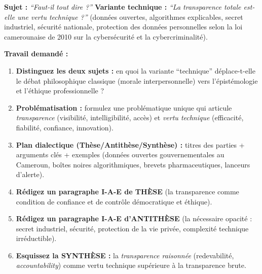 \documentclass[11pt]{article}
\begin{document}
\begin{exercice}
\textbf{Sujet :} \emph{``Faut-il tout dire ?''} \textbf{Variante technique :} \emph{``La transparence totale est-elle une vertu technique ?''} (données ouvertes, algorithmes explicables, secret industriel, sécurité nationale, protection des données personnelles selon la loi camerounaise de 2010 sur la cybersécurité et la cybercriminalité).

\textbf{Travail demandé :}
\begin{enumerate}
    \item \textbf{Distinguez les deux sujets :} en quoi la variante ``technique'' déplace-t-elle le débat philosophique classique (morale interpersonnelle) vers l'épistémologie et l'éthique professionnelle ?
    \item \textbf{Problématisation :} formulez une problématique unique qui articule \emph{transparence} (visibilité, intelligibilité, accès) et \emph{vertu technique} (efficacité, fiabilité, confiance, innovation).
    \item \textbf{Plan dialectique (Thèse/Antithèse/Synthèse) :} titres des parties + arguments clés + exemples (données ouvertes gouvernementales au Cameroun, boîtes noires algorithmiques, brevets pharmaceutiques, lanceurs d'alerte).
    \item \textbf{Rédigez un paragraphe I-A-E de THÈSE} (la transparence comme condition de confiance et de contrôle démocratique et éthique).
    \item \textbf{Rédigez un paragraphe I-A-E d'ANTITHÈSE} (la nécessaire opacité : secret industriel, sécurité, protection de la vie privée, complexité technique irréductible).
    \item \textbf{Esquissez la SYNTHÈSE :} la \emph{transparence raisonnée} (redevabilité, \emph{accountability}) comme vertu technique supérieure à la transparence brute.
\end{enumerate}
\end{exercice}
\end{document}
